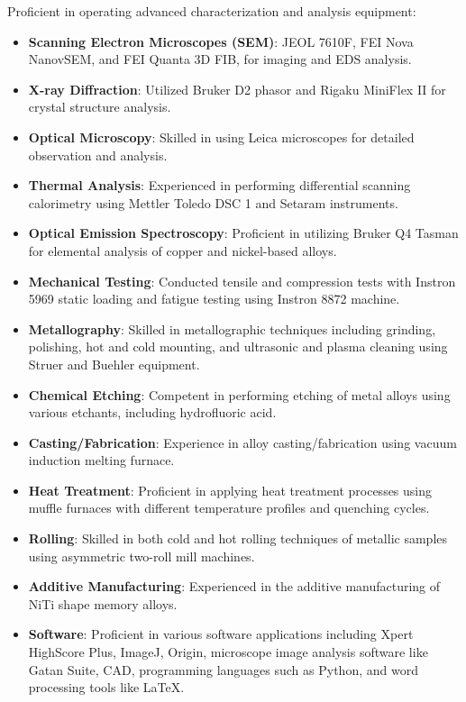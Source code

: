 

\begin{cvparagraph}

\textcolor{russell}{Proficient in operating advanced characterization and analysis equipment:}
\begin{itemize}
    \item \textcolor{russell}{\textbf{Scanning Electron Microscopes (SEM)}: JEOL 7610F, FEI Nova NanovSEM, and FEI Quanta 3D FIB, for imaging and EDS analysis.}
    \item \textcolor{russell}{\textbf{X-ray Diffraction}: Utilized Bruker D2 phasor and Rigaku MiniFlex II for crystal structure analysis.}
    \item \textcolor{russell}{\textbf{Optical Microscopy}: Skilled in using Leica microscopes for detailed observation and analysis.}
    \item \textcolor{russell}{\textbf{Thermal Analysis}: Experienced in performing differential scanning calorimetry using Mettler Toledo DSC 1 and Setaram instruments.}
    \item \textcolor{russell}{\textbf{Optical Emission Spectroscopy}: Proficient in utilizing Bruker Q4 Tasman for elemental analysis of copper and nickel-based alloys.}
    \item \textcolor{russell}{\textbf{Mechanical Testing}: Conducted tensile and compression tests with Instron 5969 static loading and fatigue testing using Instron 8872 machine.}
    \item \textcolor{russell}{\textbf{Metallography}: Skilled in metallographic techniques including grinding, polishing, hot and cold mounting, and ultrasonic and plasma cleaning using Struer and Buehler equipment.}
    \item \textcolor{russell}{\textbf{Chemical Etching}: Competent in performing etching of metal alloys using various etchants, including hydrofluoric acid.}
    \item \textcolor{russell}{\textbf{Casting/Fabrication}: Experience in alloy casting/fabrication using vacuum induction melting furnace.}
    \item\textcolor{russell}{\textbf{Heat Treatment}: Proficient in applying heat treatment processes using muffle furnaces with different temperature profiles and quenching cycles.}
    \item \textcolor{russell}{\textbf{Rolling}: Skilled in both cold and hot rolling techniques of metallic samples using asymmetric two-roll mill machines.}
    \item \textcolor{russell}{\textbf{Additive Manufacturing}: Experienced in the additive manufacturing of NiTi shape memory alloys.}
    \item \textcolor{russell}{\textbf{Software}: Proficient in various software applications including Xpert HighScore Plus, ImageJ, Origin, microscope image analysis software like Gatan Suite, CAD, programming languages such as Python, and word processing tools like LaTeX.}%
\end{itemize}
\end{cvparagraph}